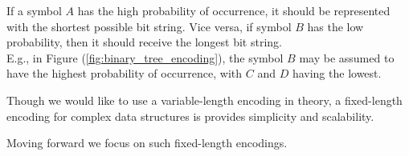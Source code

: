 \begin{theo}

    \label{theo:variable_length_encoding}

    \noindent
    If a symbol $A$ has the high probability of occurrence, it should be represented with the shortest possible bit string.
    Vice versa, if symbol $B$ has the low probability, then it should receive the longest bit string.\\

    \noindent
    E.g., in Figure (\ref{fig:binary_tree_encoding}), the symbol $B$ may be assumed to have the highest probability of occurrence,
    with $C$ and $D$ having the lowest.
\end{theo}

\begin{theo}

    \label{theo:variable_vs_fixed_length_encoding}

    \noindent
    Though we would like to use a variable-length encoding in theory, a fixed-length encoding for complex 
    data structures is provides simplicity and scalability.
\end{theo}

\noindent
Moving forward we focus on such fixed-length encodings.

\newpage 



